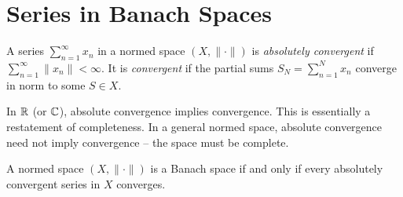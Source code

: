 \documentclass[11pt,a4paper]{article}
\begin{document}

\section{Series in Banach Spaces}
\label{sec:series}

\begin{definition}
\label{def:abs_conv}
A series $\sum_{n=1}^\infty x_n$ in a normed space $(X, \|\cdot\|)$ is
\emph{absolutely convergent} if $\sum_{n=1}^\infty \|x_n\| < \infty$.
It is \emph{convergent} if the partial sums
$S_N = \sum_{n=1}^N x_n$ converge in norm to some $S \in X$.
\end{definition}

\begin{remark}
In $\mathbb{R}$ (or $\mathbb{C}$), absolute convergence implies convergence. This is
essentially a restatement of completeness. In a general normed space,
absolute convergence need not imply convergence -- the space must be
complete.
\end{remark}

\begin{theorem}
\label{thm:banach_series}
A normed space $(X, \|\cdot\|)$ is a Banach space if and only if every
absolutely convergent series in $X$ converges.
\end{theorem}
\end{document}

